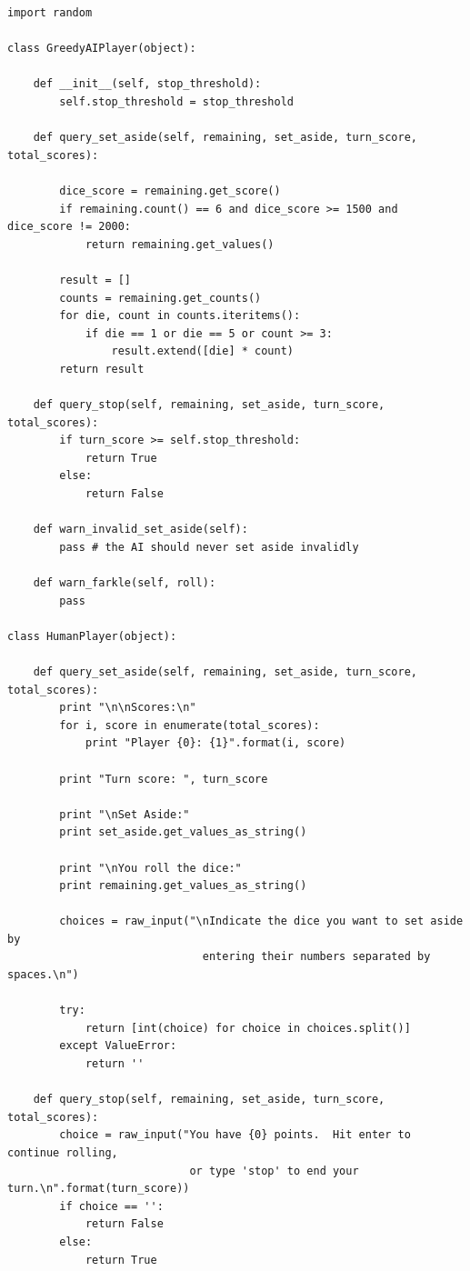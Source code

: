 \documentclass{article}
\begin{document}
\lstset{language=Python,numbers=left,showspaces=false,showstringspaces=false,basicstyle=\footnotesize,numberstyle=\footnotesize}
\begin{lstlisting}
import random

class GreedyAIPlayer(object):

    def __init__(self, stop_threshold):
        self.stop_threshold = stop_threshold

    def query_set_aside(self, remaining, set_aside, turn_score, total_scores):

        dice_score = remaining.get_score()
        if remaining.count() == 6 and dice_score >= 1500 and dice_score != 2000:
            return remaining.get_values()

        result = []
        counts = remaining.get_counts()
        for die, count in counts.iteritems():
            if die == 1 or die == 5 or count >= 3:
                result.extend([die] * count)
        return result

    def query_stop(self, remaining, set_aside, turn_score, total_scores):
        if turn_score >= self.stop_threshold:
            return True
        else:
            return False

    def warn_invalid_set_aside(self):
        pass # the AI should never set aside invalidly

    def warn_farkle(self, roll):
        pass

class HumanPlayer(object):

    def query_set_aside(self, remaining, set_aside, turn_score, total_scores):
        print "\n\nScores:\n"
        for i, score in enumerate(total_scores):
            print "Player {0}: {1}".format(i, score)

        print "Turn score: ", turn_score

        print "\nSet Aside:"
        print set_aside.get_values_as_string()

        print "\nYou roll the dice:"
        print remaining.get_values_as_string()

        choices = raw_input("\nIndicate the dice you want to set aside by
                              entering their numbers separated by spaces.\n")

        try:
            return [int(choice) for choice in choices.split()]
        except ValueError:
            return ''

    def query_stop(self, remaining, set_aside, turn_score, total_scores):
        choice = raw_input("You have {0} points.  Hit enter to continue rolling,
                            or type 'stop' to end your turn.\n".format(turn_score))
        if choice == '':
            return False
        else:
            return True


\end{lstlisting}
\end{document}
